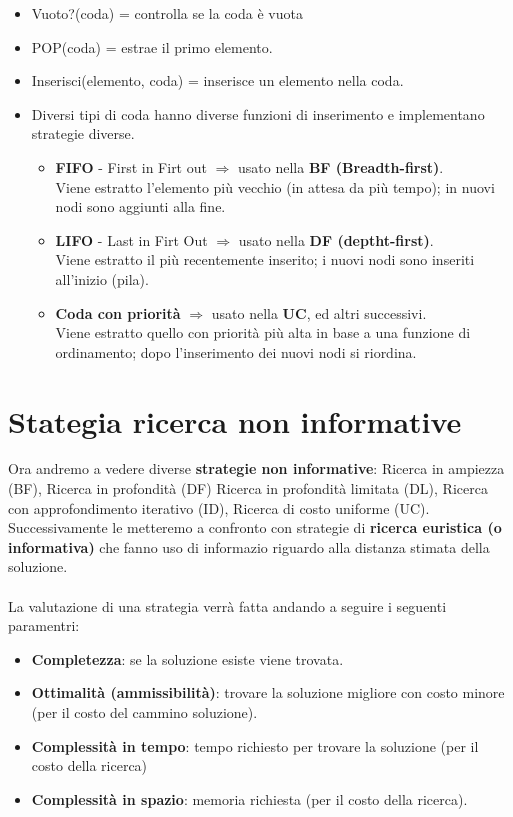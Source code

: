 \begin{itemize}
	\item Vuoto?(coda) = controlla se la coda è vuota
	\item POP(coda) = estrae il primo elemento.
	\item Inserisci(elemento, coda) = inserisce un elemento nella coda.
	\item Diversi tipi di coda hanno diverse funzioni di inserimento e implementano strategie diverse.
	\begin{itemize}
		\item \textbf{FIFO} - First in Firt out $\Longrightarrow$ usato nella \textbf{BF (Breadth-first)}.\\
		Viene estratto l’elemento più vecchio (in attesa da più tempo); in nuovi nodi sono aggiunti alla fine.
		\item \textbf{LIFO} - Last in Firt Out $\Longrightarrow$ usato nella \textbf{DF (deptht-first)}.\\
		Viene estratto il più recentemente inserito; i nuovi nodi sono inseriti all’inizio (pila).
		\item \textbf{Coda con priorità} $\Longrightarrow$ usato nella \textbf{UC}, ed altri successivi.\\
		Viene estratto quello con priorità più alta in base a una funzione di ordinamento; dopo l’inserimento dei nuovi nodi si riordina.
	\end{itemize}
\end{itemize}
\newpage
\section{Stategia ricerca non informative}
Ora andremo a vedere diverse \textbf{strategie non informative}: Ricerca in ampiezza (BF), Ricerca in profondità (DF)
Ricerca in profondità limitata (DL), Ricerca con approfondimento iterativo (ID), Ricerca di costo uniforme (UC).
Successivamente le metteremo a confronto con strategie di \textbf{ricerca euristica (o informativa)} che fanno uso di informazio riguardo alla distanza
stimata della soluzione.\\\\
La valutazione di una strategia verrà fatta andando a seguire i seguenti paramentri:
\begin{itemize}
	\item \textbf{Completezza}: se la soluzione esiste viene trovata.
	\item \textbf{Ottimalità (ammissibilità)}: trovare la soluzione migliore con costo minore (per il costo del cammino soluzione).
	\item \textbf{Complessità in tempo}: tempo richiesto per trovare la soluzione (per il costo della ricerca)
	\item \textbf{Complessità in spazio}: memoria richiesta (per il costo della ricerca).
\end{itemize}

